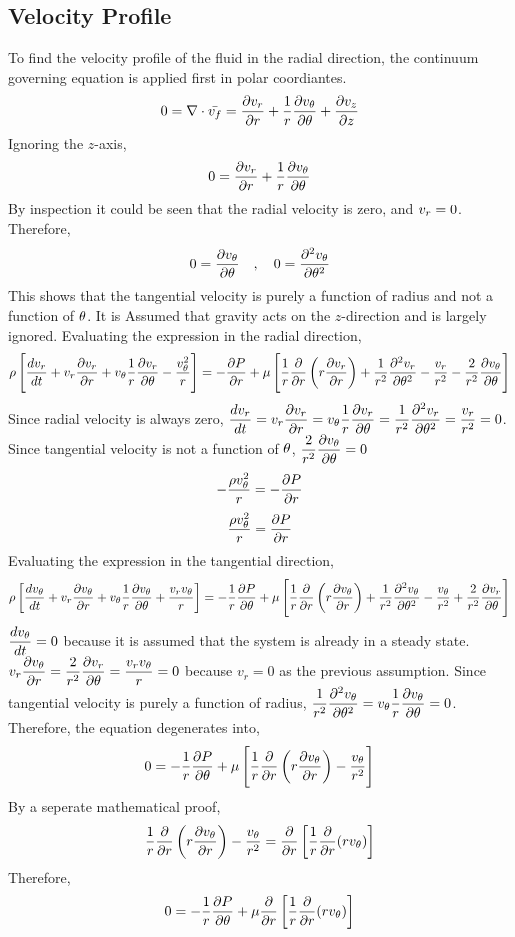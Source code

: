 \documentclass[class=report, 12pt, crop=false]{standalone}
\begin{document}
\begin{center}
\subsection{Velocity Profile}
\begin{comment}
\end{comment}
To find the velocity profile of the fluid in the radial direction, the continuum governing equation is applied first in polar coordiantes.
$$0 = \nabla\cdot\bar{v_f} = \frac{\partial v_r}{\partial r} + \frac{1}{r}\frac{\partial v_\theta}{\partial\theta} + \frac{\partial v_z}{\partial z}$$
Ignoring the $z$-axis,
$$0 = \frac{\partial v_r}{\partial r} + \frac{1}{r}\frac{\partial v_\theta}{\partial\theta}$$
By inspection it could be seen that the radial velocity is zero, and $\displaystyle{v_r = 0}$. Therefore,
$$0 = \frac{\partial v_\theta}{\partial\theta}\quad,\quad 0 = \frac{\partial^2 v_\theta}{\partial\theta^2}$$
This shows that the tangential velocity is purely a function of radius and not a function of $\theta$. It is Assumed that gravity acts on the $z$-direction and is largely ignored. 
Evaluating the expression in the radial direction,
$$\rho\left[\frac{dv_r}{dt} + v_r\frac{\partial v_r}{\partial r} + v_\theta\frac{1}{r}\frac{\partial v_r}{\partial\theta} - \frac{v_\theta^2}{r}\right] = - \frac{\partial P}{\partial r} + \mu\left[\frac{1}{r}\frac{\partial}{\partial r}\left(r\frac{\partial v_r}{\partial r}\right) + \frac{1}{r^2}\frac{\partial^2 v_r}{\partial \theta^2} - \frac{v_r}{r^2} - \frac{2}{r^2}\frac{\partial v_\theta}{\partial\theta}\right]$$
Since radial velocity is always zero, $\displaystyle{\frac{dv_r}{dt} = v_r\frac{\partial v_r}{\partial r} = v_\theta\frac{1}{r}\frac{\partial v_r}{\partial\theta} = \frac{1}{r^2}\frac{\partial^2 v_r}{\partial\theta^2} = \frac{v_r}{r^2} = 0}$. Since tangential velocity is not a function of $\theta$, $\displaystyle{\frac{2}{r^2}\frac{\partial v_\theta}{\partial\theta} = 0}$
$$- \frac{\rho v_\theta^2}{r} = - \frac{\partial P}{\partial r}$$
$$\frac{\rho v_\theta^2}{r} = \frac{\partial P}{\partial r}$$
Evaluating the expression in the tangential direction,
$$\rho\left[\frac{dv_\theta}{dt} + v_r\frac{\partial v_\theta}{\partial r} + v_\theta\frac{1}{r}\frac{\partial v_\theta}{\partial\theta} + \frac{v_rv_\theta}{r}\right] = - \frac{1}{r}\frac{\partial P}{\partial\theta} + \mu\left[\frac{1}{r}\frac{\partial}{\partial r}\left(r\frac{\partial v_\theta}{\partial r}\right) + \frac{1}{r^2}\frac{\partial^2 v_\theta}{\partial \theta^2} - \frac{v_\theta}{r^2} + \frac{2}{r^2}\frac{\partial v_r}{\partial\theta}\right]$$
$\displaystyle{\frac{dv_\theta}{dt} = 0}$ because it is assumed that the system is already in a steady state. $\displaystyle{v_r\frac{\partial v_\theta}{\partial r} = \frac{2}{r^2}\frac{\partial v_r}{\partial\theta}  = \frac{v_rv_\theta}{r}= 0}$ because $v_r = 0$ as the previous assumption. Since tangential velocity is purely a function of radius, $\displaystyle{\frac{1}{r^2}\frac{\partial^2 v_\theta}{\partial\theta^2} = v_\theta\frac{1}{r}\frac{\partial v_\theta}{\partial\theta} = 0}$. Therefore, the equation degenerates into,
$$0 = - \frac{1}{r}\frac{\partial P}{\partial\theta} + \mu\left[\frac{1}{r}\frac{\partial}{\partial r}\left(r\frac{\partial v_\theta}{\partial r}\right) - \frac{v_\theta}{r^2}\right]$$
By a seperate mathematical proof,
$$\frac{1}{r}\frac{\partial}{\partial r}\left(r\frac{\partial v_\theta}{\partial r}\right) - \frac{v_\theta}{r^2} = \frac{\partial}{\partial r}\left[\frac{1}{r}\frac{\partial}{\partial r}(rv_\theta)\right]$$
Therefore,
$$0 = - \frac{1}{r}\frac{\partial P}{\partial\theta} + \mu\frac{\partial}{\partial r}\left[\frac{1}{r}\frac{\partial}{\partial r}(rv_\theta)\right]$$

\end{center}
\end{document}
